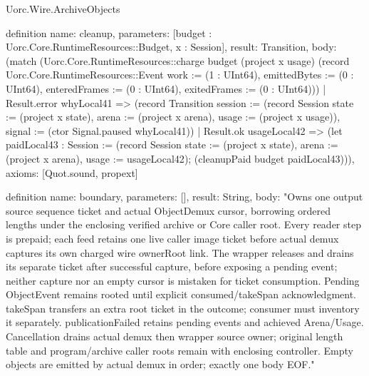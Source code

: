 \begin{lexlean}{Uorc.Wire.ArchiveObjects}
\begin{semanticmodule}
definition{
  name: cleanup,
  parameters: [budget : Uorc.Core.RuntimeResources::Budget, x : Session],
  result: Transition,
  body: (match (Uorc.Core.RuntimeResources::charge budget (project x usage) (record Uorc.Core.RuntimeResources::Event {work := (1 : UInt64), emittedBytes := (0 : UInt64), enteredFrames := (0 : UInt64), exitedFrames := (0 : UInt64)}))
    | Result.error whyLocal41 => (record Transition {session := (record Session {state := (project x state), arena := (project x arena), usage := (project x usage)}), signal := (ctor Signal.paused whyLocal41)})
    | Result.ok usageLocal42 => (let paidLocal43 : Session := (record Session {state := (project x state), arena := (project x arena), usage := usageLocal42}); (cleanupPaid budget paidLocal43))),
  axioms: [Quot.sound, propext]
}

definition{
  name: boundary,
  parameters: [],
  result: String,
  body: "Owns one output source sequence ticket and actual ObjectDemux cursor, borrowing ordered lengths under the enclosing verified archive or Core caller root. Every reader step is prepaid; each feed retains one live caller image ticket before actual demux captures its own charged wire ownerRoot link. The wrapper releases and drains its separate ticket after successful capture, before exposing a pending event; neither capture nor an empty cursor is mistaken for ticket consumption. Pending ObjectEvent remains rooted until explicit consumed/takeSpan acknowledgment. takeSpan transfers an extra root ticket in the outcome; consumer must inventory it separately. publicationFailed retains pending events and achieved Arena/Usage. Cancellation drains actual demux then wrapper source owner; original length table and program/archive caller roots remain with enclosing controller. Empty objects are emitted by actual demux in order; exactly one body EOF."
}
\end{semanticmodule}
\end{lexlean}
